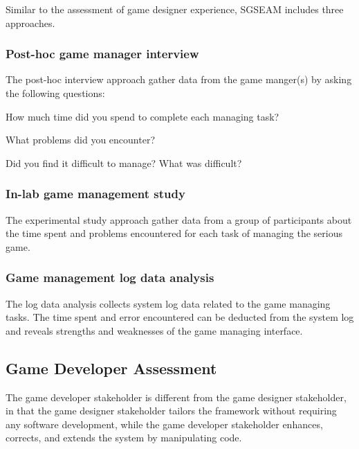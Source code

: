 Similar to the assessment of game designer experience, SGSEAM includes three approaches. 

\subsubsection{Post-hoc game manager interview}
\label{Post-hoc game manager interview}

The post-hoc interview approach gather data from the game manger(s) by asking the following questions:\\
 
\begin{compactitem}
\item How much time did you spend to complete each managing task?
\item What problems did you encounter?
\item Did you find it difficult to manage? What was difficult?\\
\end{compactitem}

\subsubsection{In-lab game management study}
\label{In-lab game management study}

The experimental study approach gather data from a group of participants about the time spent and
problems encountered for each task of managing the serious game. 

\subsubsection{Game management log data analysis}
\label{Game management log data analysis}

The log data analysis collects system log data related to the game managing tasks. The time spent and error encountered can be deducted from the system log and reveals strengths and weaknesses of the game managing interface.

\subsection{Game Developer Assessment}

The game developer stakeholder is different from the game designer stakeholder, in that the
game designer stakeholder tailors the framework without requiring any software
development, while the game developer stakeholder enhances, corrects, and extends the system by
manipulating code. 

